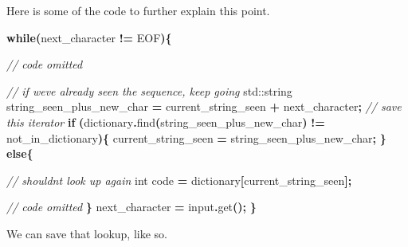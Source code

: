 \documentclass[12pt,twoside]{reedthesis}
\newenvironment{Shaded}{\begin{snugshade}}{\end{snugshade}}
\newcommand{\BuiltInTok}[1]{#1}
\newcommand{\CommentTok}[1]{\textcolor[rgb]{0.56,0.35,0.01}{\textit{#1}}}
\newcommand{\ControlFlowTok}[1]{\textcolor[rgb]{0.13,0.29,0.53}{\textbf{#1}}}
\newcommand{\DataTypeTok}[1]{\textcolor[rgb]{0.13,0.29,0.53}{#1}}
\newcommand{\NormalTok}[1]{#1}
\newcommand{\OperatorTok}[1]{\textcolor[rgb]{0.81,0.36,0.00}{\textbf{#1}}}
\begin{document}
Here is some of the code to further explain this point.
\begin{Shaded}
\begin{Highlighting}[]
\ControlFlowTok{while}\OperatorTok{(}\NormalTok{next\_character }\OperatorTok{!=}\NormalTok{ EOF}\OperatorTok{)\{}

    \CommentTok{// code omitted}


    \CommentTok{// if we\textquotesingle{}ve already seen the sequence, keep going}
    \BuiltInTok{std::}\NormalTok{string}\OperatorTok{ }\NormalTok{string\_seen\_plus\_new\_char }\OperatorTok{=}\NormalTok{ current\_string\_seen }
                                                \OperatorTok{+}\NormalTok{ next\_character}\OperatorTok{;}
    \CommentTok{// save this iterator\textasciigrave{}}
    \ControlFlowTok{if} \OperatorTok{(}\NormalTok{dictionary}\OperatorTok{.}\NormalTok{find}\OperatorTok{(}\NormalTok{string\_seen\_plus\_new\_char}\OperatorTok{)} \OperatorTok{!=} 
\NormalTok{                                            not\_in\_dictionary}\OperatorTok{)\{}
\NormalTok{        current\_string\_seen }\OperatorTok{=}\NormalTok{ string\_seen\_plus\_new\_char}\OperatorTok{;}
    \OperatorTok{\}}
    \ControlFlowTok{else}\OperatorTok{\{}

        \CommentTok{// shouldn\textquotesingle{}t look up again}
        \DataTypeTok{int}\NormalTok{ code }\OperatorTok{=}\NormalTok{ dictionary}\OperatorTok{[}\NormalTok{current\_string\_seen}\OperatorTok{];}


        \CommentTok{// code omitted}
    \OperatorTok{\}}
\NormalTok{    next\_character }\OperatorTok{=}\NormalTok{ input}\OperatorTok{.}\NormalTok{get}\OperatorTok{();}
\OperatorTok{\}}
\end{Highlighting}
\end{Shaded}
We can save that lookup, like so.
\end{document}
